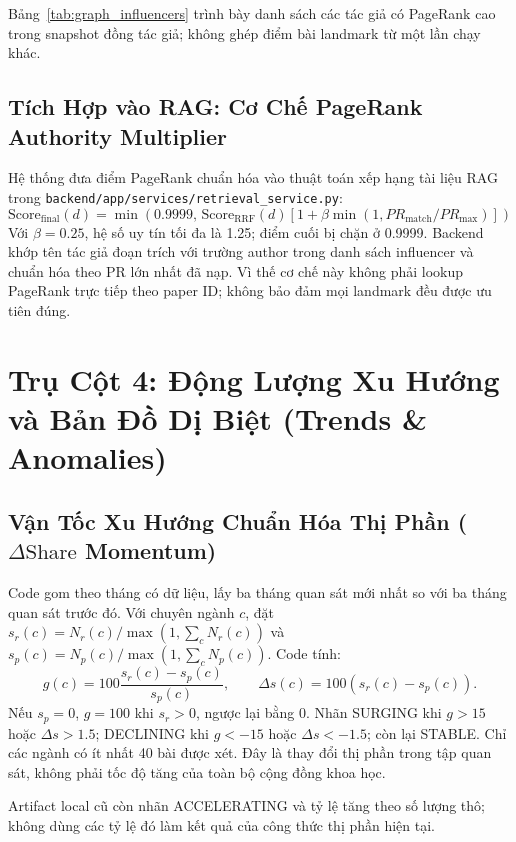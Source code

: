 Bảng~\ref{tab:graph_influencers} trình bày danh sách các tác giả có PageRank cao trong snapshot đồng tác giả; không ghép điểm bài landmark từ một lần chạy khác.



\subsection{Tích Hợp vào RAG: Cơ Chế PageRank Authority Multiplier}
Hệ thống đưa điểm PageRank chuẩn hóa vào thuật toán xếp hạng tài liệu RAG trong \texttt{backend/app/services/retrieval\_service.py}:
\begin{equation}
  \text{Score}_{\text{final}}(d) = \min\!\left(0.9999,\,\text{Score}_{\text{RRF}}(d)\left[1+\beta\min(1, PR_{\mathrm{match}}/PR_{\max})\right]\right)
\end{equation}
Với $\beta=0.25$, hệ số uy tín tối đa là 1.25; điểm cuối bị chặn ở 0.9999. Backend khớp tên tác giả đoạn trích với trường author trong danh sách influencer và chuẩn hóa theo PR lớn nhất đã nạp. Vì thế cơ chế này không phải lookup PageRank trực tiếp theo paper ID; không bảo đảm mọi landmark đều được ưu tiên đúng.

\section{Trụ Cột 4: Động Lượng Xu Hướng và Bản Đồ Dị Biệt (Trends \& Anomalies)}

\subsection{Vận Tốc Xu Hướng Chuẩn Hóa Thị Phần ($\Delta\text{Share}$ Momentum)}
Code gom theo tháng có dữ liệu, lấy ba tháng quan sát mới nhất so với ba tháng quan sát trước đó. Với chuyên ngành $c$, đặt $s_r(c)=N_r(c)/\max(1,\sum_c N_r(c))$ và $s_p(c)=N_p(c)/\max(1,\sum_c N_p(c))$. Code tính:
\begin{equation}
g(c)=100\frac{s_r(c)-s_p(c)}{s_p(c)},\qquad \Delta s(c)=100(s_r(c)-s_p(c)).
\end{equation}
Nếu $s_p=0$, $g=100$ khi $s_r>0$, ngược lại bằng 0. Nhãn SURGING khi $g>15$ hoặc $\Delta s>1.5$; DECLINING khi $g<-15$ hoặc $\Delta s<-1.5$; còn lại STABLE. Chỉ các ngành có ít nhất 40 bài được xét. Đây là thay đổi thị phần trong tập quan sát, không phải tốc độ tăng của toàn bộ cộng đồng khoa học.

Artifact local cũ còn nhãn ACCELERATING và tỷ lệ tăng theo số lượng thô; không dùng các tỷ lệ đó làm kết quả của công thức thị phần hiện tại.

